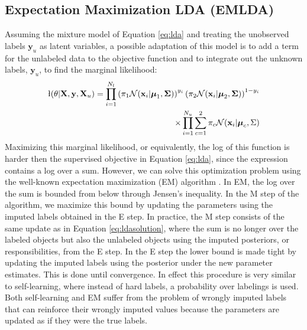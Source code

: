 \documentclass[10pt, a4paper, conference]{IEEEtran}
\begin{document}
\subsection{Expectation Maximization LDA (EMLDA)}
Assuming the mixture model of Equation \eqref{eq:lda} and treating the unobserved labels $\mathbf{y}_u$ as latent variables, a possible adaptation of this model is to add a term for the unlabeled data to the objective function and to integrate out the unknown labels, $\mathbf{y}_u$, to find the marginal likelihood:
\begin{align}
\l(\theta|\mathbf{X},\mathbf{y},\mathbf{X}_u)=\prod_{i=1}^{N_l}\left(\pi_1 \mathcal{N}(\mathbf{x}_i|\boldsymbol{\mu}_1,\mathbf{\Sigma})\right)^{y_i} \left(\pi_2 \mathcal{N}(\mathbf{x}_i|\boldsymbol{\mu}_2,\mathbf{\Sigma})\right)^{1-y_i}  \nonumber \\ 
\times \prod_{i=1}^{N_u} \sum_{c=1}^2 \pi_c \mathcal{N}(\mathbf{x}_i|\boldsymbol{\mu}_c,\Sigma)
\end{align}
Maximizing this marginal likelihood, or equivalently, the log of this function is harder then the supervised objective in Equation \eqref{eq:lda}, since the expression contains a log over a sum. However, we can solve this optimization problem using the well-known expectation maximization (EM) algorithm \cite{Dempster1977, Nigam2000}. In EM, the log over the sum is bounded from below through Jensen's inequality. In the M step of the algorithm, we maximize this bound by updating the parameters using the imputed labels obtained in the E step. In practice, the M step consists of the same update as in Equation \eqref{eq:ldasolution}, where the sum is no longer over the labeled objects but also the unlabeled objects using the imputed posteriors, or responsibilities, from the E step. In the E step the lower bound is made tight by updating the imputed labels using the posterior under the new parameter estimates. This is done until convergence. 
In effect this procedure is very similar to self-learning, where instead of hard labels, a probability over labelings is used. Both self-learning and EM suffer from the problem of wrongly imputed labels that can reinforce their wrongly imputed values because the parameters are updated as if they were the true labels.
\end{document}
